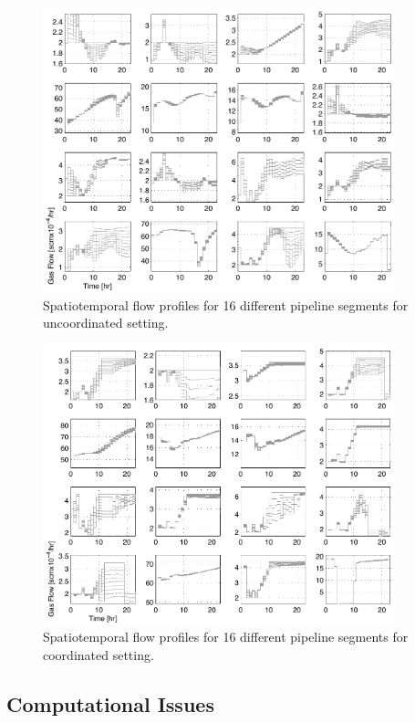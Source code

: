\documentclass[11pt,twoside]{article}
\begin{document}
\begin{figure}[h!]
\begin{center}
\includegraphics[width=4in]{flow_decoupled.pdf}\caption{Spatiotemporal flow profiles for 16 different pipeline segments for uncoordinated setting.}\label{flow_uncoupled}
\end{center}
\end{figure}

\begin{figure}[h!]
\begin{center}
\includegraphics[width=4in]{flow_coupled.pdf}\caption{Spatiotemporal flow profiles for 16 different pipeline segments for coordinated setting.}\label{flow_coupled}
\end{center}
\end{figure}

\subsection{Computational Issues}
\end{document}
